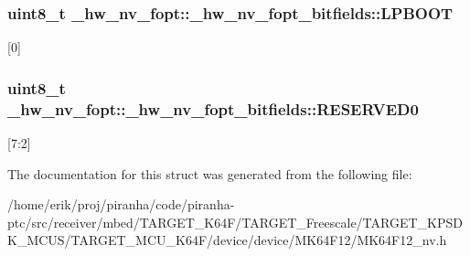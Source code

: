 \subsubsection[{\texorpdfstring{L\+P\+B\+O\+OT}{LPBOOT}}]{\setlength{\rightskip}{0pt plus 5cm}uint8\+\_\+t \+\_\+hw\+\_\+nv\+\_\+fopt\+::\+\_\+hw\+\_\+nv\+\_\+fopt\+\_\+bitfields\+::\+L\+P\+B\+O\+OT}\hypertarget{struct__hw__nv__fopt_1_1__hw__nv__fopt__bitfields_a836dc525699285fff99d3d56a17c66e0}{}\label{struct__hw__nv__fopt_1_1__hw__nv__fopt__bitfields_a836dc525699285fff99d3d56a17c66e0}
\mbox{[}0\mbox{]} 
\subsubsection[{\texorpdfstring{R\+E\+S\+E\+R\+V\+E\+D0}{RESERVED0}}]{\setlength{\rightskip}{0pt plus 5cm}uint8\+\_\+t \+\_\+hw\+\_\+nv\+\_\+fopt\+::\+\_\+hw\+\_\+nv\+\_\+fopt\+\_\+bitfields\+::\+R\+E\+S\+E\+R\+V\+E\+D0}\hypertarget{struct__hw__nv__fopt_1_1__hw__nv__fopt__bitfields_a9905767d9c9383a5bf7623e683d1279e}{}\label{struct__hw__nv__fopt_1_1__hw__nv__fopt__bitfields_a9905767d9c9383a5bf7623e683d1279e}
\mbox{[}7\+:2\mbox{]} 

The documentation for this struct was generated from the following file\+:\begin{DoxyCompactItemize}
\item 
/home/erik/proj/piranha/code/piranha-\/ptc/src/receiver/mbed/\+T\+A\+R\+G\+E\+T\+\_\+\+K64\+F/\+T\+A\+R\+G\+E\+T\+\_\+\+Freescale/\+T\+A\+R\+G\+E\+T\+\_\+\+K\+P\+S\+D\+K\+\_\+\+M\+C\+U\+S/\+T\+A\+R\+G\+E\+T\+\_\+\+M\+C\+U\+\_\+\+K64\+F/device/device/\+M\+K64\+F12/M\+K64\+F12\+\_\+nv.\+h\end{DoxyCompactItemize}
